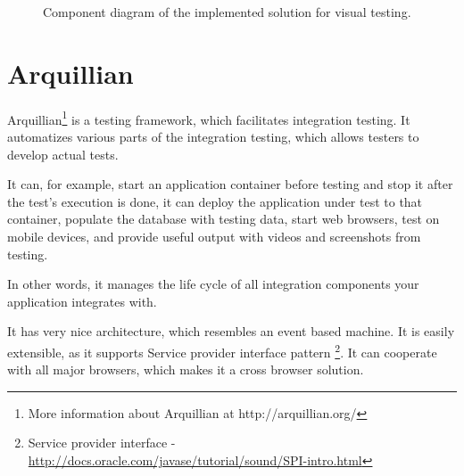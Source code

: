 \documentclass[11pt,oneside,final]{fithesis2}
\begin{document}
\begin{figure}[!htb]
    \begin{center}
    \leavevmode
    \centerline{}
    \end{center}
    \caption{Component diagram of the implemented solution for visual testing.}
    \label{fig:componentDiagramOfImpl}
\end{figure}
  
\section{Arquillian}
Arquillian\footnote{More information about Arquillian at http://arquillian.org/} is a testing framework, which facilitates integration testing. It automatizes various parts
of the integration testing, which allows testers to develop actual tests.

It can, for example, start an application container before testing and stop it after the test's execution 
is done, it can deploy the application under test to that container, populate the database with testing data, 
start web browsers, test on mobile devices, and provide useful output with videos and screenshots 
from testing.

In other words, it manages the life cycle of all integration components your application integrates with.

It has very nice architecture, which resembles an event based machine. It is easily extensible, as it
supports Service provider interface pattern \footnote{Service provider interface - \url{http://docs.oracle.com/javase/tutorial/sound/SPI-intro.html}}. It can cooperate with all major browsers, which makes
it a cross browser solution. 
\end{document}
